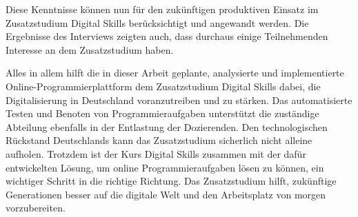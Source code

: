 Diese Kenntnisse können nun für den zukünftigen produktiven Einsatz im
Zusatzstudium Digital Skills berücksichtigt und angewandt werden. Die Ergebnisse
des Interviews zeigten auch, dass durchaus einige Teilnehmenden Interesse an dem
Zusatzstudium haben.

\newpage

Alles in allem hilft die in dieser Arbeit geplante, analysierte und
implementierte Online-Programmierplattform dem Zusatzstudium Digital Skills
dabei, die Digitalisierung in Deutschland voranzutreiben und zu stärken. Das
automatisierte Testen und Benoten von Programmieraufgaben unterstützt die
zuständige Abteilung ebenfalls in der Entlastung der Dozierenden. Den
technologischen Rückstand Deutschlands kann das Zusatzstudium sicherlich nicht
alleine aufholen. Trotzdem ist der Kurs Digital Skills zusammen mit der
dafür entwickelten Lösung, um online Programmieraufgaben lösen zu können, ein
wichtiger Schritt in die richtige Richtung. Das Zusatzstudium hilft, zukünftige
Generationen besser auf die digitale Welt und den Arbeitsplatz von morgen
vorzubereiten.
